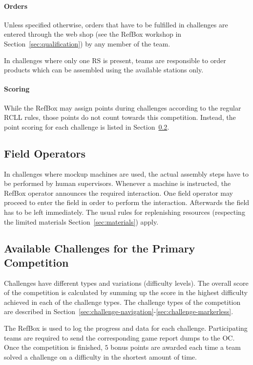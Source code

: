 \documentclass[12pt,twoside]{article}
\newcommand{\refsec}[1]{Section~\ref{#1}}
\begin{document}
\paragraph{Orders}
Unless specified otherwise, orders that have to be fulfilled in challenges
are entered through the web shop
(see the RefBox workshop in \refsec{sec:qualification})
by any member of the team.

In challenges where only one \ac{RS} is present, teams are responsible to
order products which can be assembled using the available stations only.

\paragraph{Scoring}\label{sec:scoring}
While the RefBox may assign points during challenges according to the
regular RCLL rules, those points do not count towards this competition.
Instead, the point scoring for each challenge is listed in
\refsec{sec:challenges}.

\subsection{Field Operators}\label{sec:operators}
In challenges where mockup machines are used, the actual assembly steps have
to be performed by human supervisors. Whenever a machine is instructed,
the RefBox operator announces the required interaction. One field operator may
proceed to enter the field in order to perform the interaction. Afterwards the
field has to be left immediately.
The usual rules for replenishing resources (respecting the limited materials
\refsec{sec:materials}) apply.

\subsection{Available Challenges for the Primary Competition}
\label{sec:challenges}
Challenges have different types and variations (difficulty levels).
The overall score of the competition is calculated by summing up the score
in the highest difficulty achieved in each of the challenge types.
The challenge types of the competition are described in
\refsec{sec:challenge-navigation}-\ref{sec:challenge-markerless}.

The RefBox is used to log the progress and data for each challenge.
Participating teams are required to send the corresponding game report dumps
to the \ac{OC}.
Once the competition is finished, $5$ bonus points are awarded each time a
team solved a challenge on a difficulty in the shortest amount of time.
\end{document}

